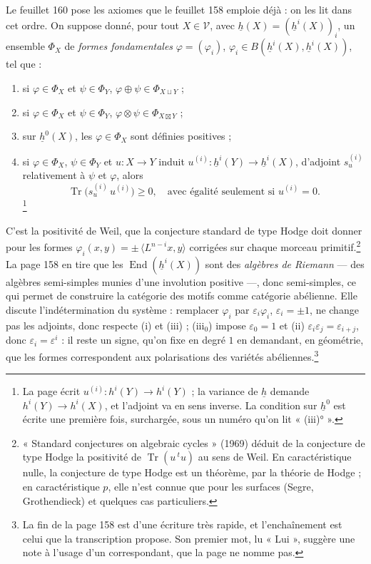 \documentclass[11pt,a4paper]{article}
\begin{document}
Le feuillet 160 pose les axiomes que le feuillet 158 emploie déjà : on les lit dans
cet ordre. On suppose donné, pour tout $X \in \mathcal{V}$, avec $\underline{h}(X) =
(\underline{h}^{i}(X))_{i}$, un ensemble $\Phi_{X}$ de \emph{formes fondamentales}
$\varphi = (\varphi_{i})$, $\varphi_{i} \in B(\underline{h}^{i}(X), \underline{h}^{i}(X))$,
tel que :
\begin{enumerate}
  \item[(i)] si $\varphi \in \Phi_{X}$ et $\psi \in \Phi_{Y}$, $\varphi \oplus \psi \in
  \Phi_{X \sqcup Y}$ ;
  \item[(ii)] si $\varphi \in \Phi_{X}$ et $\psi \in \Phi_{Y}$, $\varphi \otimes \psi \in
  \Phi_{X \boxtimes Y}$ ;
  \item[(iii$_{0}$)] sur $\underline{h}^{0}(X)$, les $\varphi \in \Phi_{X}$ sont définies
  positives ;
  \item[(iii)] si $\varphi \in \Phi_{X}$, $\psi \in \Phi_{Y}$ et $u \colon X \to Y$
  induit $u^{(i)} \colon \underline{h}^{i}(Y) \to \underline{h}^{i}(X)$, d'adjoint
  $s^{(i)}_{u}$ relativement à $\psi$ et $\varphi$, alors
  \[
  \operatorname{Tr}\bigl(s^{(i)}_{u}\,u^{(i)}\bigr) \geqslant 0 , \quad
  \text{avec égalité seulement si } u^{(i)} = 0 .
  \]\footnote{La page écrit $u^{(i)} \colon h^{i}(Y) \to h^{i}(Y)$ ; la
variance de $\underline{h}$ demande $h^{i}(Y) \to h^{i}(X)$, et l'adjoint va en sens
inverse. La condition sur $\underline{h}^{0}$ est écrite une première fois,
surchargée, sous un numéro qu'on lit « (iii)° ».}
\end{enumerate}

C'est la positivité de Weil, que la conjecture standard de type Hodge doit donner
pour les formes $\varphi_{i}(x, y) = \pm\,\langle L^{n-i}x, y\rangle$ corrigées sur
chaque morceau primitif.\footnote{« Standard conjectures on algebraic cycles »
(1969) déduit de la conjecture de type Hodge la positivité de
$\operatorname{Tr}(u\,{}^{t}u)$ au sens de Weil. En caractéristique nulle, la
conjecture de type Hodge est un théorème, par la théorie de Hodge ; en
caractéristique $p$, elle n'est connue que pour les surfaces (Segre, Grothendieck)
et quelques cas particuliers.} La page 158 en tire que les
$\operatorname{End}(\underline{h}^{i}(X))$ sont des \emph{algèbres de Riemann} ---
des algèbres semi-simples munies d'une involution positive ---, donc semi-simples, ce
qui permet de construire la catégorie des motifs comme catégorie abélienne. Elle
discute l'indétermination du système : remplacer $\varphi_{i}$ par
$\varepsilon_{i}\varphi_{i}$, $\varepsilon_{i} = \pm 1$, ne change pas les adjoints,
donc respecte (i) et (iii) ; (iii$_{0}$) impose $\varepsilon_{0} = 1$ et (ii)
$\varepsilon_{i}\varepsilon_{j} = \varepsilon_{i+j}$, donc $\varepsilon_{i} =
\varepsilon^{i}$ : il reste un signe, qu'on fixe en degré $1$ en demandant, en
géométrie, que les formes correspondent aux polarisations des variétés
abéliennes.\footnote{La fin de la page 158 est d'une écriture très rapide, et
l'enchaînement est celui que la transcription propose. Son premier mot, lu « Lui »,
suggère une note à l'usage d'un correspondant, que la page ne nomme pas.}
\end{document}
